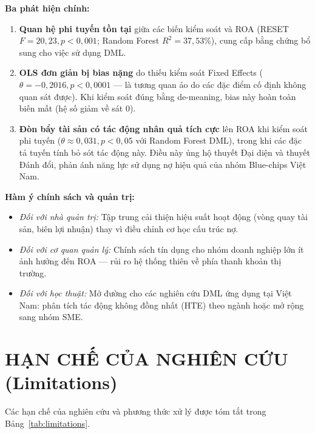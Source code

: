 \documentclass[12pt,a4paper]{article}
\begin{document}
\noindent\textbf{Ba phát hiện chính:}
\begin{enumerate}
    \item \textbf{Quan hệ phi tuyến tồn tại} giữa các biến kiểm soát và ROA (RESET $F = 20,23, p < 0,001$; Random Forest $R^2 = 37,53\%$), cung cấp bằng chứng bổ sung cho việc sử dụng DML.
    \item \textbf{OLS đơn giản bị bias nặng} do thiếu kiểm soát Fixed Effects ($\theta = -0,2016, p < 0,0001$ --- là tương quan ảo do các đặc điểm cố định không quan sát được). Khi kiểm soát đúng bằng de-meaning, bias này hoàn toàn biến mất (hệ số giảm về sát 0).
    \item \textbf{Đòn bẩy tài sản có tác động nhân quả tích cực} lên ROA khi kiểm soát phi tuyến ($\theta \approx 0,031, p < 0,05$ với Random Forest DML), trong khi các đặc tả tuyến tính bỏ sót tác động này. Điều này ủng hộ thuyết Đại diện và thuyết Đánh đổi, phản ánh năng lực sử dụng nợ hiệu quả của nhóm Blue-chips Việt Nam.
\end{enumerate}

\noindent\textbf{Hàm ý chính sách và quản trị:}
\begin{itemize}
    \item \textit{Đối với nhà quản trị:} Tập trung cải thiện hiệu suất hoạt động (vòng quay tài sản, biên lợi nhuận) thay vì điều chỉnh cơ học cấu trúc nợ.
    \item \textit{Đối với cơ quan quản lý:} Chính sách tín dụng cho nhóm doanh nghiệp lớn ít ảnh hưởng đến ROA --- rủi ro hệ thống thiên về phía thanh khoản thị trường.
    \item \textit{Đối với học thuật:} Mở đường cho các nghiên cứu DML ứng dụng tại Việt Nam: phân tích tác động không đồng nhất (HTE) theo ngành hoặc mở rộng sang nhóm SME.
\end{itemize}

\section{HẠN CHẾ CỦA NGHIÊN CỨU (Limitations)}
Các hạn chế của nghiên cứu và phương thức xử lý được tóm tắt trong Bảng~\ref{tab:limitations}.
\end{document}
